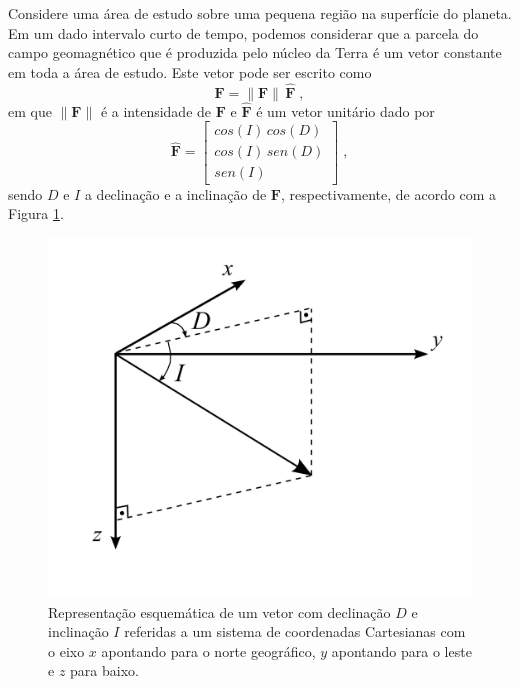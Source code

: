 \documentclass[10pt,a4paper,fleqn]{article}
\begin{document}
Considere uma \'{a}rea de estudo sobre uma pequena região na superfície do planeta. 
Em um dado intervalo curto de tempo, podemos considerar que a parcela do campo 
geomagnético que é produzida pelo n\'{u}cleo da Terra é 
um vetor constante em toda a \'{a}rea de estudo. Este vetor pode ser escrito como
\begin{equation}
\mathbf{F} = \| \mathbf{F} \| \, \hat{\mathbf{F}} \; ,
\label{eq:campo-geomagnetico}
\end{equation}
em que $\| \mathbf{F} \|$ é a intensidade de $\mathbf{F}$ e $\hat{\mathbf{F}}$ é um vetor unitário
dado por
\begin{equation}
\hat{\mathbf{F}} = \left[
\begin{array}{c}
cos(I) \, cos(D) \\
cos(I) \, sen(D) \\
sen(I)
\end{array}
\right] \; ,
\label{eq:versor-campo-geomagnetico}
\end{equation}
sendo $D$ e $I$ a declinação e a inclinação de $\mathbf{F}$, respectivamente, de 
acordo com a Figura \ref{fig:fig3}.

\begin{figure}[h]
    \centering
    \includegraphics[scale=1]{Figs/Fig3.png}
    \caption{Representação esquemática de um vetor com declinação $D$ e inclinação $I$ referidas
        a um sistema de coordenadas Cartesianas com o eixo $x$ apontando para o norte geográfico,
        $y$ apontando para o leste e $z$ para baixo.}   
    \label{fig:fig3}
\end{figure}
\end{document}
